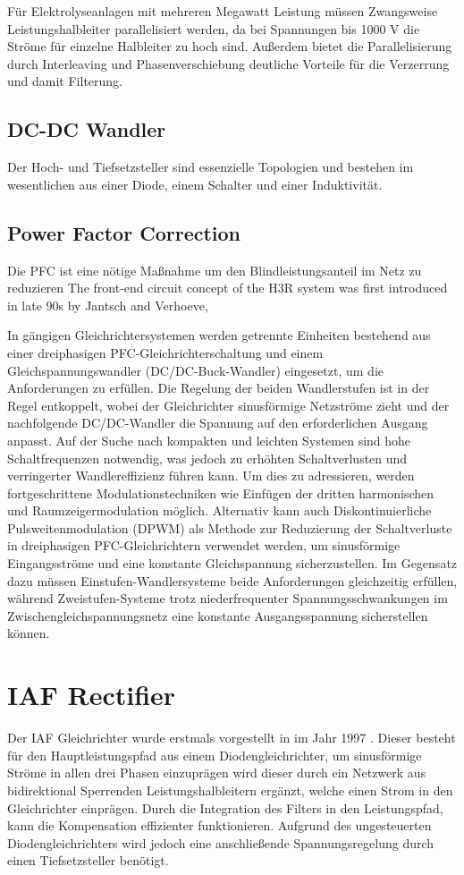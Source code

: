 		Für Elektrolyseanlagen mit mehreren Megawatt Leistung müssen Zwangsweise Leistungshalbleiter parallelisiert werden, da bei Spannungen bis 1000 V die Ströme für einzelne Halbleiter zu hoch sind. Außerdem bietet die Parallelisierung durch Interleaving und Phasenverschiebung deutliche Vorteile für die Verzerrung und damit Filterung. 
		
		\subsection{DC-DC Wandler}
		Der Hoch- und Tiefsetzsteller sind essenzielle Topologien und bestehen im wesentlichen aus einer Diode, einem Schalter und einer Induktivität. 
			
		\subsection{Power Factor Correction}
			Die \gls{PFC} ist eine nötige Maßnahme um den Blindleistungsanteil im Netz zu reduzieren 
			The front-end circuit concept of the H3R system was first introduced in late 90s by Jantsch and Verhoeve,

In gängigen Gleichrichtersystemen werden getrennte Einheiten bestehend aus einer dreiphasigen PFC-Gleichrichterschaltung und einem Gleichspannungswandler (DC/DC-Buck-Wandler) eingesetzt, um die Anforderungen zu erfüllen. Die Regelung der beiden Wandlerstufen ist in der Regel entkoppelt, wobei der Gleichrichter sinusförmige Netzströme zieht und der nachfolgende DC/DC-Wandler die Spannung auf den erforderlichen Ausgang anpasst. Auf der Suche nach kompakten und leichten Systemen sind hohe Schaltfrequenzen notwendig, was jedoch zu erhöhten Schaltverlusten und verringerter Wandlereffizienz führen kann. Um dies zu adressieren, werden fortgeschrittene Modulationstechniken wie Einfügen der dritten harmonischen und Raumzeigermodulation möglich. Alternativ kann auch Diskontinuierliche Pulsweitenmodulation (DPWM) als Methode zur Reduzierung der Schaltverluste in dreiphasigen PFC-Gleichrichtern verwendet werden, um sinusförmige Eingangsströme und eine konstante Gleichspannung sicherzustellen. Im Gegensatz dazu müssen Einstufen-Wandlersysteme beide Anforderungen gleichzeitig erfüllen, während Zweistufen-Systeme trotz niederfrequenter Spannungsschwankungen im Zwischengleichspannungsnetz eine konstante Ausgangsspannung sicherstellen können.			
			
\section{IAF Rectifier}
Der \gls{IAF} Gleichrichter wurde erstmals vorgestellt in \cite{IAFfirst} im Jahr 1997 . Dieser besteht für den Hauptleistungspfad aus einem Diodengleichrichter, um sinusförmige Ströme in allen drei Phasen einzuprägen wird dieser durch ein Netzwerk aus bidirektional Sperrenden Leistungshalbleitern ergänzt, welche einen Strom in den Gleichrichter einprägen. Durch die Integration des Filters in den Leistungspfad, kann die Kompensation effizienter funktionieren. Aufgrund des ungesteuerten Diodengleichrichters wird jedoch eine anschließende Spannungsregelung durch einen Tiefsetzsteller benötigt.


